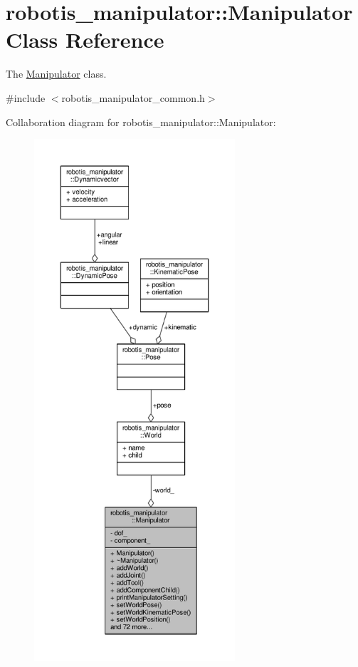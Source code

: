 \hypertarget{classrobotis__manipulator_1_1_manipulator}{}\section{robotis\+\_\+manipulator\+:\+:Manipulator Class Reference}
\label{classrobotis__manipulator_1_1_manipulator}


The \hyperlink{classrobotis__manipulator_1_1_manipulator}{Manipulator} class.  




{\ttfamily \#include $<$robotis\+\_\+manipulator\+\_\+common.\+h$>$}



Collaboration diagram for robotis\+\_\+manipulator\+:\+:Manipulator\+:\nopagebreak
\begin{figure}[H]
\begin{center}
\leavevmode
\includegraphics[height=550pt]{classrobotis__manipulator_1_1_manipulator__coll__graph}
\end{center}
\end{figure}
